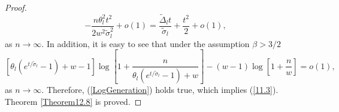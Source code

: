 \documentclass[12pt]{amsart}
\theoremstyle{definition}
\numberwithin{equation}{section}
\begin{document}
\begin{proof}
\begin{equation}
-\frac{n\theta_l^2t^2}{2w^2\tilde{\sigma}_l^2}+o(1)=\frac{\tilde{\Delta}_l t}{\tilde{\sigma}_l}+\frac{t^2}{2}+o(1),
\end{equation}
as $n\rightarrow\infty$. In addition, it is easy to see that
under the assumption $\beta>3/2$
\begin{equation}
\left[\theta_l\left(e^{t/\tilde{\sigma}_l}-1\right)+w-1\right]\log\left[1+
\frac{n}{\theta_l\left(e^{t/\tilde{\sigma}_l}-1\right)+w}\right]
-(w-1)\log\left[1+\frac{n}{w}\right]=o(1),
\end{equation}
as $n\rightarrow\infty$. Therefore,  (\ref{LogGeneration})
holds true, which implies (\ref{11.3}).
Theorem \ref{Theorem12.8} is proved.
\end{proof}








































\end{document}
